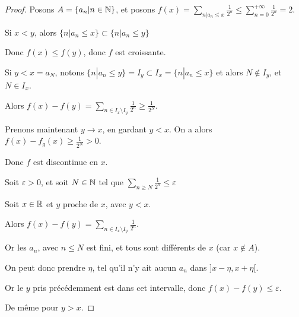 \begin{proof}
    Posons $A = \{ a_n | n \in \mathbb{N} \}$, et posons 
    $f(x) = \sum_{n | a_n \leqslant x} \frac{1}{2^n} \leqslant \sum_{n = 0 }^{+\infty} \frac{1}{2^n} = 2$.

    Si $x < y$, alors $\{n | a_n \leqslant x\} \subset \{ n | a_n \leqslant y \}$

    Donc $f(x) \leqslant f(y)$, donc $f$ est croissante.


    \svspace Si $y < x = a_N$, notons $\{ n | a_n \leqslant y \} = I_y \subset I_x = \{ n | a_n \leqslant x \}$
    et alors $N \notin I_y$, et $N \in I_x$.

    Alors $\displaystyle f(x) - f(y) = \sum_{n \in I_x \setminus I_y} \frac{1}{2^n} \geqslant \frac{1}{2^N}$.

    Prenons maintenant $y \to x$, en gardant $y < x$. On a alors $f(x) - f_g(x) \geqslant \frac{1}{2^N} > 0$.

    Donc $f$ est discontinue en $x$.


    \svspace Soit $\varepsilon > 0$, et soit $N \in \mathbb{N}$ tel que 
    $\displaystyle \sum_{n \geqslant N } \frac{1 }{2^n } \leqslant \varepsilon$
   
    Soit $x \in \mathbb{R}$ et $y$ proche de $x$, avec $y < x$.

    Alors $\displaystyle f(x) - f(y) = \sum_{n \in I_x \setminus I_y} \frac{1}{2^n}$.

    Or les $a_n$, avec $n \leqslant N$ est fini, et tous sont différents de $x$ (car $x \notin A$). 

    On peut donc prendre $\eta$, tel qu'il n'y ait aucun $a_n$ dans $]x - \eta, x + \eta[$. 

    Or le $y$ pris précédemment est dans cet intervalle, donc $f(x) - f(y) \leqslant \varepsilon$. 

    De même pour $y > x$.
\end{proof}

